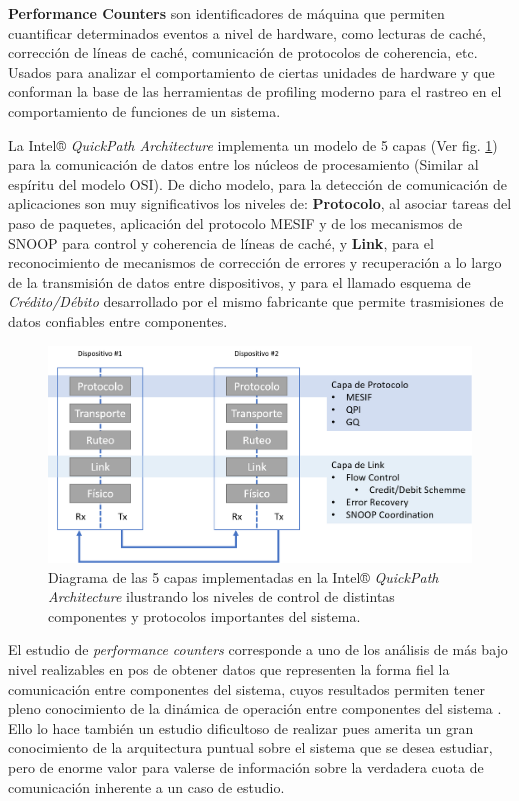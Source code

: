 \begin{defn} \textbf{Performance Counters} son identificadores de máquina que permiten cuantificar determinados eventos a nivel de hardware, como lecturas de caché, corrección de líneas de caché, comunicación de protocolos de coherencia, etc. Usados para analizar el comportamiento de ciertas unidades de hardware y que conforman la base de las herramientas de profiling moderno para el rastreo en el comportamiento de funciones de un sistema.
\end{defn}

La Intel® \emph{QuickPath Architecture} implementa un modelo de 5 capas (Ver fig. \ref{fig:5layersqpi}) para la comunicación de datos entre los núcleos de procesamiento (Similar al espíritu del modelo OSI). De dicho modelo, para la detección de comunicación de aplicaciones son muy significativos los niveles de: \textbf{Protocolo}, al asociar tareas del paso de paquetes, aplicación del protocolo MESIF y de los mecanismos de SNOOP para control y coherencia de líneas de caché, y \textbf{Link}, para el reconocimiento de mecanismos de corrección de errores y recuperación a lo largo de la transmisión de datos entre dispositivos, y para el llamado esquema de \emph{Crédito/Débito} desarrollado por el mismo fabricante que permite trasmisiones de datos confiables entre componentes.

\begin{figure}[!h]
	\centering
	\includegraphics[scale=.5]{imagenes/5layersqpi.png}
	\caption{Diagrama de las 5 capas implementadas en la Intel® \emph{QuickPath Architecture} ilustrando los niveles de control de distintas componentes y protocolos importantes del sistema.}
	\label{fig:5layersqpi}
\end{figure}

El estudio de \emph{performance counters} corresponde a uno de los análisis de más bajo nivel realizables en pos de obtener datos que representen la forma fiel la comunicación entre componentes del sistema, cuyos resultados permiten tener pleno conocimiento de la dinámica de operación entre componentes del sistema \cite{paper:aplicacionDeHPCTOOLKIT}. Ello lo hace también un estudio dificultoso de realizar pues amerita un gran conocimiento de la arquitectura puntual sobre el sistema que se desea estudiar, pero de enorme valor para valerse de información sobre la verdadera cuota de comunicación inherente a un caso de estudio.

